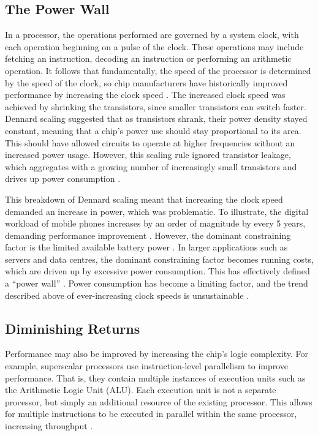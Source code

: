 \documentclass[bsc,frontabs,singlespacing,parskip,deptreport]{infthesis}
\begin{document}
\subsection{The Power Wall} \label{the-power-wall}
In a processor, the operations performed are governed by a system clock, with each operation beginning on a pulse of the clock. These operations may include fetching an instruction, decoding an instruction or performing an arithmetic operation. It follows that fundamentally, the speed of the processor is determined by the speed of the clock, so chip manufacturers have historically improved performance by increasing the clock speed \cite{stallings}. The increased clock speed was achieved by shrinking the transistors, since smaller transistors can switch faster. Dennard scaling \cite{dennard_1999} suggested that as transistors shrank, their power density stayed constant, meaning that a chip's power use should stay proportional to its area. This should have allowed circuits to operate at higher frequencies without an increased power usage. However, this scaling rule ignored transistor leakage, which aggregates with a growing number of increasingly small transistors and drives up power consumption \cite{bohr_2007}.

This breakdown of Dennard scaling meant that increasing the clock speed demanded an increase in power, which was problematic. To illustrate, the digital workload of mobile phones increases by an order of magnitude by every 5 years, demanding performance improvement \cite{berkel_2009}. However, the dominant constraining factor is the limited available battery power \cite{berkel_2009}. In larger applications such as servers and data centres, the dominant constraining factor becomes running costs, which are driven up by excessive power consumption. This has effectively defined a “power wall” \cite{patterson-hennessy}. Power consumption has become a limiting factor, and the trend described above of ever-increasing clock speeds is unsustainable \cite{blake_2009}.

\subsection{Diminishing Returns} \label{performance-growth}
Performance may also be improved by increasing the chip's logic complexity. For example, superscalar processors use instruction-level parallelism to improve performance. That is, they contain multiple instances of execution units such as the Arithmetic Logic Unit (ALU). Each execution unit is not a separate processor, but simply an additional resource of the existing processor. This allows for multiple instructions to be executed in parallel within the same processor, increasing throughput \cite{stallings}.
\end{document}
